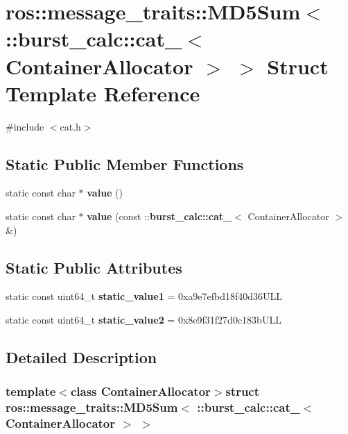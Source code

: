 \section{ros\-:\-:message\-\_\-traits\-:\-:\-M\-D5\-Sum$<$ \-:\-:burst\-\_\-calc\-:\-:cat\-\_\-$<$ \-Container\-Allocator $>$ $>$ \-Struct \-Template \-Reference}
\label{structros_1_1message__traits_1_1MD5Sum_3_01_1_1burst__calc_1_1cat___3_01ContainerAllocator_01_4_01_4}


{\ttfamily \#include $<$cat.\-h$>$}

\subsection*{\-Static \-Public \-Member \-Functions}
\begin{DoxyCompactItemize}
\item 
static const char $\ast$ {\bf value} ()
\item 
static const char $\ast$ {\bf value} (const \-::{\bf burst\-\_\-calc\-::cat\-\_\-}$<$ \-Container\-Allocator $>$ \&)
\end{DoxyCompactItemize}
\subsection*{\-Static \-Public \-Attributes}
\begin{DoxyCompactItemize}
\item 
static const uint64\-\_\-t {\bf static\-\_\-value1} = 0xa9e7efbd18f40d36\-U\-L\-L
\item 
static const uint64\-\_\-t {\bf static\-\_\-value2} = 0x8e9f31f27d0c183b\-U\-L\-L
\end{DoxyCompactItemize}


\subsection{\-Detailed \-Description}
\subsubsection*{template$<$class Container\-Allocator$>$struct ros\-::message\-\_\-traits\-::\-M\-D5\-Sum$<$ \-::burst\-\_\-calc\-::cat\-\_\-$<$ Container\-Allocator $>$ $>$}



